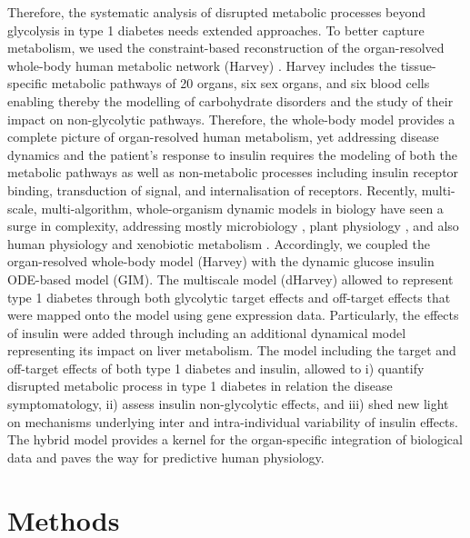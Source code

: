 Therefore, the systematic analysis of disrupted metabolic processes beyond glycolysis in type 1 diabetes needs extended approaches. To better capture metabolism, we used the constraint-based reconstruction of the organ-resolved whole-body human metabolic network (Harvey) \cite{thiele2018metabolism}. Harvey includes the tissue-specific metabolic pathways of 20 organs, six sex organs, and six blood cells enabling thereby the modelling of carbohydrate disorders and the study of their impact on non-glycolytic pathways. Therefore, the whole-body model provides a complete picture of organ-resolved human metabolism, yet addressing disease dynamics and the patient's response to insulin requires the modeling of both the metabolic pathways as well as non-metabolic processes including insulin receptor binding, transduction of signal, and internalisation of receptors. Recently, multi-scale, multi-algorithm, whole-organism dynamic models in biology \cite{oyaas2017genome} have seen a surge in complexity, addressing mostly microbiology \cite{karr2012whole,covert2008integrating}, plant physiology \cite{grafahrend2013multiscale}, and also human physiology and xenobiotic metabolism \cite{krauss2012integrating}. 
Accordingly, we coupled the organ-resolved whole-body model (Harvey) with the dynamic glucose insulin ODE-based model (GIM). The multiscale model (dHarvey) allowed to represent type 1 diabetes through both glycolytic target effects and off-target effects that were mapped onto the model using gene expression data. Particularly, the effects of insulin were added through including an additional dynamical model representing its impact on liver metabolism. The model including the target and off-target effects of both type 1 diabetes and insulin, allowed to i) quantify disrupted metabolic process in type 1 diabetes in relation the disease symptomatology, ii) assess insulin non-glycolytic effects, and iii) shed new light on mechanisms underlying inter and intra-individual variability of insulin effects. The hybrid model provides a kernel for the organ-specific integration of biological data and paves the way for predictive human physiology.

\section{Methods}
